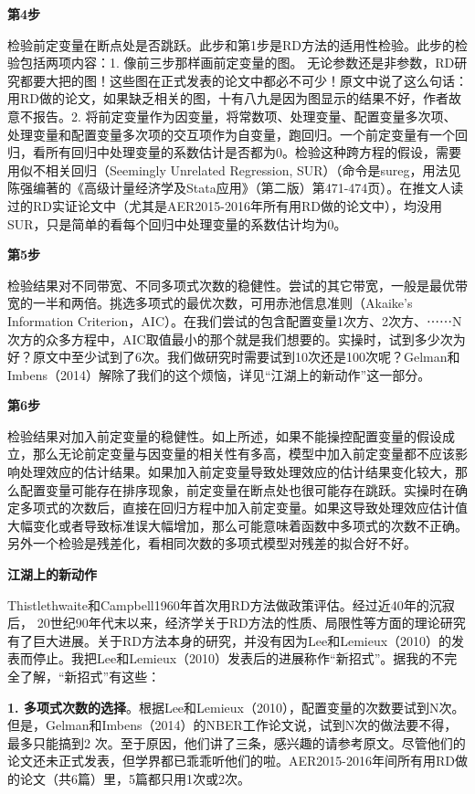 \documentclass[cn,10pt,math=newtx,citestyle=gb7714-2015,bibstyle=gb7714-2015]{elegantbook}
\begin{document}
	\textbf{第4步}
	
	检验前定变量在断点处是否跳跃。此步和第1步是RD方法的适用性检验。此步的检验包括两项内容：1. 像前三步那样画前定变量的图。 无论参数还是非参数，RD研究都要大把的图！这些图在正式发表的论文中都必不可少！原文中说了这么句话：用RD做的论文，如果缺乏相关的图，十有八九是因为图显示的结果不好，作者故意不报告。2. 将前定变量作为因变量，将常数项、处理变量、配置变量多次项、处理变量和配置变量多次项的交互项作为自变量，跑回归。一个前定变量有一个回归，看所有回归中处理变量的系数估计是否都为0。检验这种跨方程的假设，需要用似不相关回归（Seemingly Unrelated Regression, SUR）（命令是sureg，用法见陈强编著的《高级计量经济学及Stata应用》（第二版）第471-474页）。在推文人读过的RD实证论文中（尤其是AER2015-2016年所有用RD做的论文中），均没用SUR，只是简单的看每个回归中处理变量的系数估计均为0。
	
	\textbf{第5步}
	
	检验结果对不同带宽、不同多项式次数的稳健性。尝试的其它带宽，一般是最优带宽的一半和两倍。挑选多项式的最优次数，可用赤池信息准则（Akaike's Information Criterion，AIC）。在我们尝试的包含配置变量1次方、2次方、⋯⋯N次方的众多方程中，AIC取值最小的那个就是我们想要的。实操时，试到多少次为好？原文中至少试到了6次。我们做研究时需要试到10次还是100次呢？Gelman和Imbens（2014）解除了我们的这个烦恼，详见“江湖上的新动作”这一部分。
	
	\textbf{第6步}
	
	检验结果对加入前定变量的稳健性。如上所述，如果不能操控配置变量的假设成立，那么无论前定变量与因变量的相关性有多高，模型中加入前定变量都不应该影响处理效应的估计结果。如果加入前定变量导致处理效应的估计结果变化较大，那么配置变量可能存在排序现象，前定变量在断点处也很可能存在跳跃。实操时在确定多项式的次数后，直接在回归方程中加入前定变量。如果这导致处理效应估计值大幅变化或者导致标准误大幅增加，那么可能意味着函数中多项式的次数不正确。另外一个检验是残差化，看相同次数的多项式模型对残差的拟合好不好。
	
	\textbf{江湖上的新动作}
	
	Thistlethwaite和Campbell1960年首次用RD方法做政策评估。经过近40年的沉寂后， 20世纪90年代末以来，经济学关于RD方法的性质、局限性等方面的理论研究有了巨大进展。关于RD方法本身的研究，并没有因为Lee和Lemieux（2010）的发表而停止。我把Lee和Lemieux（2010）发表后的进展称作“新招式”。据我的不完全了解，“新招式”有这些：
	
	\textbf{1. 多项式次数的选择}。根据Lee和Lemieux（2010），配置变量的次数要试到N次。但是，Gelman和Imbens（2014）的NBER工作论文说，试到N次的做法要不得，最多只能搞到2 次。至于原因，他们讲了三条，感兴趣的请参考原文。尽管他们的论文还未正式发表，但学界都已乖乖听他们的啦。AER2015-2016年间所有用RD做的论文（共6篇）里，5篇都只用1次或2次。
	
\end{document}
